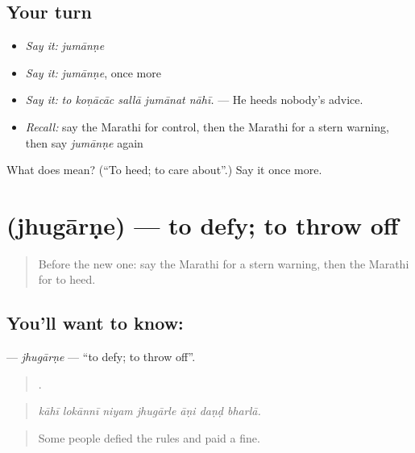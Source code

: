 \subsection*{Your turn}
\begin{itemize}
\raggedright
  \item \emph{Say it:} \emph{jumānṇe}
  \item \emph{Say it:} \emph{jumānṇe}, once more
  \item \emph{Say it:} \emph{to koṇācāc sallā jumānat nāhī.} — He heeds nobody's advice.
  \item \emph{Recall:} say the Marathi for control, then the Marathi for a stern warning, then say \emph{jumānṇe} again
\end{itemize}

\begin{tcolorbox}[breakable,colback=teal!4,colframe=teal!35!black,title={Before you move on}]
What does  mean? (\textquotedblleft{}To heed; to care about\textquotedblright{}.) Say it once more.
\end{tcolorbox}
\section[\texorpdfstring{\mr{झुगारणे} (jhugārṇe)}{झुगारणे (jhugārṇe)}]{ (jhugārṇe) — to defy; to throw off}

\label{lesson:MR-C542-jhugarne}



\begin{quote}
Before the new one: say the Marathi for a stern warning, then the Marathi for to heed.
\end{quote}

\subsection*{You'll want to know: }
\textbf{} — \emph{jhugārṇe} — \textquotedblleft{}to defy; to throw off\textquotedblright{}.

\begin{quote}
      .
\end{quote}

\begin{quote}
\emph{kāhī lokānnī niyam jhugārle āṇi daṇḍ bharlā.}
\end{quote}

\begin{quote}
Some people defied the rules and paid a fine.
\end{quote}

